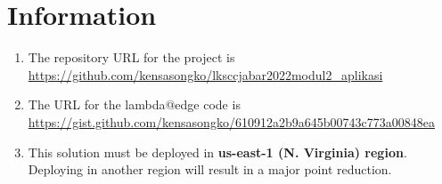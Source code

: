 \documentclass{article}
\begin{document}
\section{Information}\label{information}
\begin{enumerate}
    \item The repository URL for the project is \href{https://github.com/kensasongko/lksccjabar2022modul2_aplikasi}{https://github.com/kensasongko/lksccjabar2022modul2\_aplikasi}
    \item The URL for the lambda@edge code is \href{https://gist.github.com/kensasongko/610912a2b9a645b00743c773a00848ea}{https://gist.github.com/kensasongko/610912a2b9a645b00743c773a00848ea}
    \item This solution must be deployed in \textbf{us-east-1 (N. Virginia) region}. Deploying in another region will result in a major point reduction.
\end{enumerate}
\end{document}
